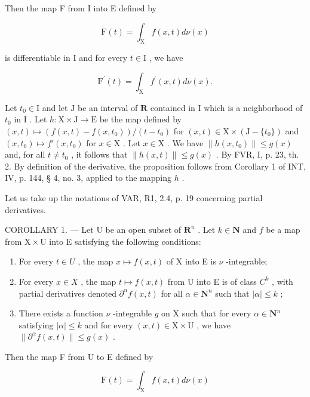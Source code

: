 Then the map F from I into E defined by

\[
\mathrm{F} (t) = \int_ {\mathrm{X}} f (x, t) d \nu (x)
\]

is differentiable in I and for every \(t \in \mathrm{I}\) , we have

\[
\mathrm{F} ^ {\prime} (t) = \int_ {\mathrm{X}} f ^ {\prime} (x, t) d \nu (x).
\]

Let \(t_0 \in \mathrm{I}\) and let \(\mathrm{J}\) be an interval of \(\mathbf{R}\) contained in \(\mathrm{I}\) which is a neighborhood of \(t_0\) in \(\mathrm{I}\) . Let \(h: \mathrm{X} \times \mathrm{J} \to \mathrm{E}\) be the map defined by \((x, t) \mapsto (f(x, t) - f(x, t_0)) / (t - t_0)\) for \((x, t) \in \mathrm{X} \times (\mathrm{J} - \{t_0\})\) and \((x, t_0) \mapsto f'(x, t_0)\) for \(x \in \mathrm{X}\) . Let \(x \in \mathrm{X}\) . We have \(\|h(x, t_0)\| \leqslant g(x)\) and, for all \(t \neq t_0\) , it follows that \(\|h(x, t)\| \leqslant g(x)\) . By FVR, I, p. 23, th. 2. By definition of the derivative, the proposition follows from Corollary 1 of INT, IV, p. 144, § 4, no. 3, applied to the mapping \(h\) .

Let us take up the notations of VAR, R1, 2.4, p. 19 concerning partial derivatives.

COROLLARY 1. --- Let U be an open subset of \(\mathbf{R}^{n}\) . Let \(k \in \mathbf{N}\) and \(f\) be a map from \(\mathrm{X} \times \mathrm{U}\) into E satisfying the following conditions:

\begin{enumerate}
\def\labelenumi{(\roman{enumi})}
\item
  For every \(t \in U\) , the map \(x \mapsto f(x, t)\) of X into E is \(\nu\) -integrable;
\item
  For every \(x \in X\) , the map \(t \mapsto f(x, t)\) from U into E is of class \(C^{k}\) , with partial derivatives denoted \(\partial^{\alpha}f(x, t)\) for all \(\alpha \in \mathbf{N}^{n}\) such that \(|\alpha| \leqslant k\) ;
\item
  There exists a function \(\nu\) -integrable \(g\) on X such that for every \(\alpha \in \mathbf{N}^n\) satisfying \(|\alpha| \leqslant k\) and for every \((x,t) \in \mathrm{X} \times \mathrm{U}\) , we have \(\|\partial^\alpha f(x,t)\| \leqslant g(x)\) .
\end{enumerate}

Then the map F from U to E defined by

\[
\mathrm{F} (t) = \int_ {\mathrm{X}} f (x, t) d \nu (x)
\]

